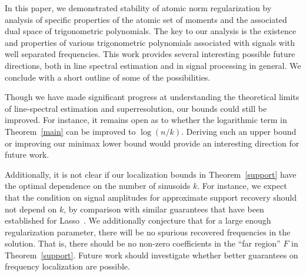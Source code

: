 In this paper, we demonstrated stability of atomic norm regularization by
analysis of specific properties of the atomic set of moments and the associated
dual space of trigonometric polynomials. The key to our analysis is the
existence and properties of various trigonometric polynomials associated with
signals with well separated frequencies. This work provides several interesting
possible future directions, both in line spectral estimation and in signal
processing in general. We conclude with a short outline of some of the
possibilities.

Though we have made significant progress at understanding the theoretical
limits of line-spectral estimation and superresolution, our bounds could still
be improved. For instance, it remains open as to whether the logarithmic term
in Theorem~\ref{main} can be improved to $\log(n/k)$. Deriving such an upper
bound or improving our minimax lower bound would provide an interesting
direction for future work.

Additionally, it is not clear if our localization bounds in
Theorem~\ref{support} have the optimal dependence on the number of sinusoids
$k$. For instance, we expect that the condition on signal amplitudes for
approximate support recovery should not depend on $k$, by comparison with
similar guarantees that have been established for Lasso~\cite{coherence}. We
additionally conjecture that for a large enough regularization parameter, there
will be no spurious recovered frequencies in the solution. That is, there
should be no non-zero coefficients in the ``far region'' $F$ in
Theorem~\ref{support}. Future work should investigate whether better guarantees
on frequency localization are possible.



